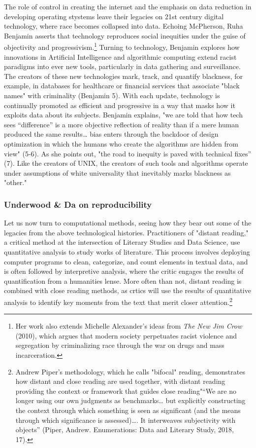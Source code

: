 \documentclass[11pt]{article}
\begin{document}
The role of control in creating the internet and the emphasis on data
reduction in developing operating stystems leave their legacies on
21st century digital technology, where race becomes collapsed into
data. Echoing McPherson, Ruha Benjamin asserts that technology
reproduces social inequities under the guise of objectivity and
progressivism.\footnote{Her work also extends Michelle Alexander's ideas from \emph{The New
Jim Crow} (2010), which argues that modern society perpetuates racist
violence and segregation by criminalizing race through the war on
drugs and mass incarceration.} Turning to technology, Benjamin explores how
innovations in Artificial Intelligence and algorithmic computing
extend racist paradigms into ever new tools, particularly in data
gathering and surveillance. The creators of these new technologies
mark, track, and quantify blackness, for example, in databases for
healthcare or financial services that associate "black names" with
criminality (Benjamin 5). With each update, technology is continually
promoted as efficient and progressive in a way that masks how it
exploits data about its subjects. Benjamin explains, "we are told that
how tech sees “difference” is a more objective reflection of reality
than if a mere human produced the same results\ldots{} bias enters through
the backdoor of design optimization in which the humans who create the
algorithms are hidden from view" (5-6). As she points out, "the road
to inequity is paved with technical fixes” (7). Like the creators of
UNIX, the creators of such tools and algorithms operate under
assumptions of white universality that inevitably marks blackness as
"other."

\subsubsection{Underwood \& Da on reproducibility}
\label{sec:org3d91d88}

Let us now turn to computational methods, seeing how they bear out
some of the legacies from the above technological
histories. Practitioners of "distant reading," a critical method at
the intersection of Literary Studies and Data Science, use
quantitative analysis to study works of literature. This process
involves deploying computer programs to clean, categorize, and count
elements in textual data, and is often followed by interpretive
analysis, where the critic engages the results of quantification from
a humanities lense. More often than not, distant reading is combined
with close reading methods, as crtics will use the results of
quantitative analysis to identify key moments from the text that merit
closer attention.\footnote{Andrew Piper's methodology, which he calls "bifocal" reading,
demonstrates how distant and close reading are used together, with
distant reading providing the context or framework that guides close
reading"“We are no longer using our own judgments as benchmarks\ldots{} but
explicitly constructing the context through which something is seen as
significant (and the means through which significance is
assessed)\ldots{}. It interweaves subjectivity with objects” (Piper,
Andrew. Enumerations: Data and Literary Study, 2018, 17).}
\end{document}
